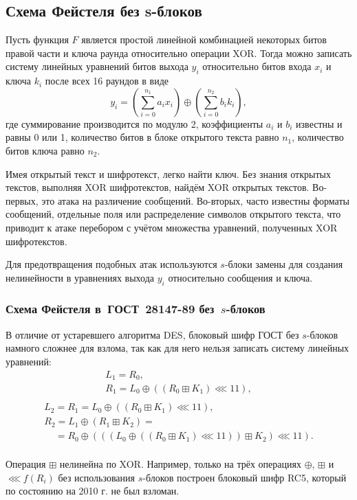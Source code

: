 \subsection{Схема Фейстеля без s-блоков}

Пусть функция $F$ является простой линейной комбинацией некоторых битов правой части и ключа раунда относительно операции XOR. Тогда можно записать систему линейных уравнений битов выхода $y_i$ относительно битов входа $x_i$ и ключа $k_i$ после всех 16 раундов в виде
    \[ y_i = (\sum_{i=0}^{n_1} a_i x_i) \oplus (\sum_{i=0}^{n_2} b_i k_i), \]
где суммирование производится по модулю 2, коэффициенты $a_i$ и $b_i$ известны и равны 0 или 1, количество битов в блоке открытого текста равно $n_1$, количество битов ключа равно $n_2$.

Имея открытый текст и шифротекст, легко найти ключ. Без знания открытых текстов, выполняя XOR шифротекстов, найдём XOR открытых текстов. Во-первых, это атака на различение сообщений. Во-вторых, часто известны форматы сообщений, отдельные поля или распределение символов открытого текста, что приводит к атаке перебором с учётом множества уравнений, полученных XOR шифротекстов.

Для предотвращения подобных атак используются $s$-блоки замены для создания нелинейности в уравнениях выхода $y_i$ относительно сообщения и ключа.


\subsubsection[Схема Фейстеля в ГОСТ 28147-89 без $s$-блоков]{Схема Фейстеля в~ГОСТ~28147-89 без~$s$-блоков}

В отличие от устаревшего алгоритма DES, блоковый шифр ГОСТ без $s$-блоков намного сложнее для взлома, так как для него нельзя записать систему линейных уравнений:
\[
    \begin{array}{l}
        L_1 = R_0, \\
        R_1 = L_0 \oplus ((R_0 \boxplus K_1) \lll 11), \\
    \end{array}
\] \[
    \begin{array}{l}
        L_2 = R_1 = L_0 \oplus ((R_0 \boxplus K_1) \lll 11), \\
        R_2 = L_1 \oplus (R_1 \boxplus K_2)  = \\
        ~~~~~= R_0 \oplus (((L_0 \oplus ((R_0 \boxplus K_1) \lll 11)) \boxplus K_2) \lll 11). \\
    \end{array}
\]

Операция $\boxplus$ нелинейна по XOR. Например, только на трёх операциях $\oplus$, $\boxplus$ и $\lll f(R_i)$ без использования $s$-блоков построен блоковый шифр RC5, который по состоянию на 2010 г. не был взломан.
